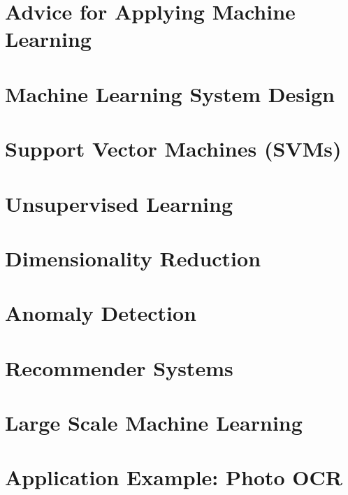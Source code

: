 \documentclass{article}
\begin{document}
    \section{Advice for Applying Machine Learning}
    \section{Machine Learning System Design}
    \section{Support Vector Machines (SVMs)}
    \section{Unsupervised Learning}
    \section{Dimensionality Reduction}
    \section{Anomaly Detection}
    \section{Recommender Systems}
    \section{Large Scale Machine Learning}
    \section{Application Example: Photo OCR}
\end{document}
